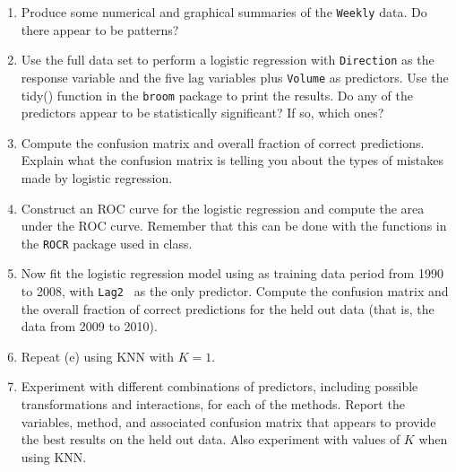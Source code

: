 \documentclass[12pt]{article}\usepackage[]{graphicx}\usepackage[]{color}
\begin{document}
\begin{enumerate}
    \begin{enumerate}
      \item Produce some numerical and graphical summaries of the {\tt Weekly} data. Do there appear to be patterns? 
      
      \item Use the full data set to perform a logistic regression with {\tt Direction} as the response variable and the five lag variables plus {\tt Volume} as predictors. Use the tidy() function in the {\tt broom} package to print the results. Do any of the predictors appear to be statistically significant? If so, which ones? 
      
      
      \item Compute the confusion matrix  and overall fraction of correct predictions. Explain what the confusion matrix is telling you about the types of mistakes made by logistic regression. 
      
      \item Construct an ROC curve for the logistic regression and compute the area under the ROC curve. Remember that this can be done with the functions in the {\tt ROCR} package used in class. 
      
     \item Now fit the logistic regression model using as training data period from 1990 to 2008, with {\tt Lag2 } as the only predictor. Compute the confusion matrix and the overall fraction of correct predictions for the held out data (that is, the data from 2009 to 2010).
     
     \item Repeat (e) using KNN with $K=1$. 
     
     \item Experiment with different combinations of predictors, including possible transformations and interactions, for each of the methods. Report the variables, method, and associated confusion matrix that appears to provide the best results on the held out data. Also experiment with values of $K$ when using KNN.   
      
    \end{enumerate} 

\end{enumerate}
\end{document}
